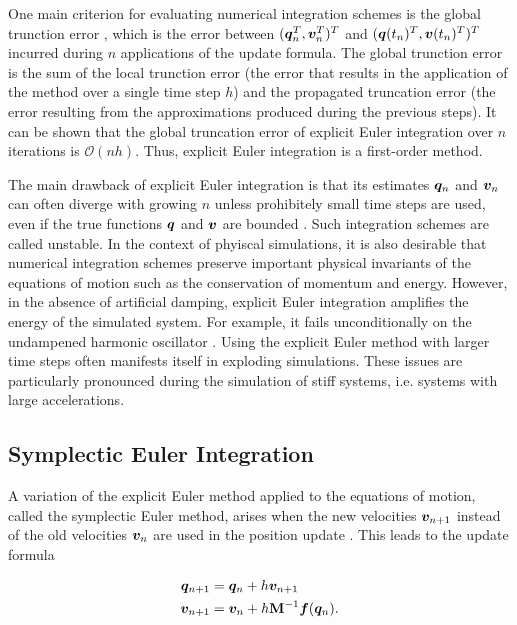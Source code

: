 One main criterion for evaluating numerical integration schemes is the global trunction error \cite{chapra2005}, which is the error between 
$(\bm{q}^T_n, \bm{v}^T_n)^T$ and $(\bm{q}(t_n)^T, \bm{v}(t_n)^T)^T$ incurred during $n$ applications of the update formula. The global 
trunction error is the sum 
of the local trunction error (the error that results in the application of the method over a single time step $h$) and the propagated truncation 
error (the
error resulting from the approximations produced during the previous steps). It can be shown that the global truncation error of explicit Euler 
integration over $n$ iterations is $\mathcal{O}(nh)$. Thus, explicit Euler integration is a first-order method. 

The main drawback of explicit Euler integration is that its estimates $\bm{q}_n$ and $\bm{v}_n$ can often diverge with growing $n$ unless 
prohibitely small time steps are used, even if the true functions $\bm{q}$ and $\bm{v}$ are bounded \cite{chapra2005}. Such integration schemes 
are called unstable. In the context of phyiscal simulations, it is also desirable that numerical integration schemes preserve important physical 
invariants of the equations of motion such as the conservation of momentum and energy. However, in the absence of artificial damping, explicit
Euler integration amplifies the energy of the simulated system. For example, it fails unconditionally on the undampened harmonic oscillator 
\cite{servin2006}. Using the explicit Euler method with larger time steps often manifests itself in exploding
simulations. These issues are particularly pronounced during the simulation of stiff systems, i.e. systems with large accelerations.

\subsection{Symplectic Euler Integration}\label{ss:symplectic-euler}
A variation of the explicit Euler method applied to the equations of motion, called the symplectic Euler method, arises when the new 
velocities $\bm{v}_{n+1}$ instead of the old velocities $\bm{v}_n$ are used in the position update \cite{stern2006}. This leads to 
the update formula

\begin{align}
    \begin{split}\label{eq:symplectic-euler}
        \bm{q}_{n+1} &= \bm{q}_n + h\bm{v}_{n+1}\\
        \bm{v}_{n+1} &= \bm{v}_n + h\mathbf{M}^{-1}\bm{f}(\bm{q}_n).
    \end{split}
\end{align}

